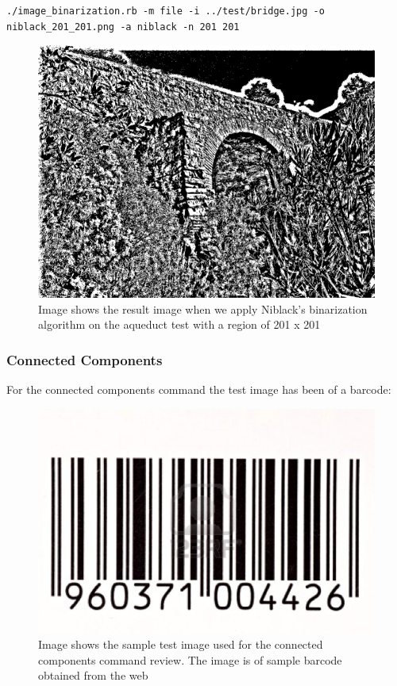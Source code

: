 \documentclass[a4paper,10pt,titlepage]{article}
\begin{document}
{\footnotesize\begin{verbatim}
./image_binarization.rb -m file -i ../test/bridge.jpg -o niblack_201_201.png -a niblack -n 201 201
\end{verbatim}}

\par \begin{figure}[H]
	\centerline{%
	\includegraphics[scale=0.3]{./images/niblack_201_201.png}
	}
	\caption[Niblack's binarization sample 201 x 201 ]{Image shows the result image when we apply Niblack's binarization algorithm on the aqueduct test with a region of 201 x 201}
\end{figure}
	
\subsubsection{Connected Components}

\par For the connected components command the test image has been of a barcode:

\par \begin{figure}[H]
	\centerline{%
	\includegraphics[scale=0.3]{./images/barcode.jpg}
	}
	\caption[Original barcode image]{Image shows the sample test image used for the connected components command review. The image is of sample barcode obtained from the web}
\end{figure}
\end{document}

